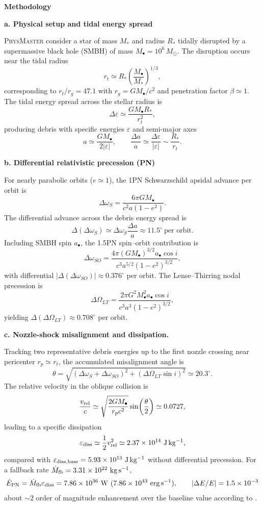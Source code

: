 \documentclass[11pt, a4paper, logo, copyright, nonumbering]{SAI}
\newcommand{\agent}{\textsc{PhysMaster}\xspace}
\begin{document}
\noindent \textbf{Methodology}

\noindent \textbf{a. Physical setup and tidal energy spread} 

\agent consider a star of mass $M_*$ and radius $R_*$ tidally disrupted by a supermassive black hole (SMBH) of mass 
$M_\bullet = 10^6\,M_\odot$. The disruption occurs near the tidal radius
\[
r_t \simeq R_* \left(\frac{M_\bullet}{M_*}\right)^{1/3},
\]
corresponding to $r_t/r_g = 47.1$ with $r_g = GM_\bullet/c^2$ and penetration factor $\beta \simeq 1$. 
The tidal energy spread across the stellar radius is
\[
\Delta\varepsilon \simeq \frac{GM_\bullet R_*}{r_t^2},
\]
producing debris with specific energies $\varepsilon$ and semi-major axes
\[
a \simeq \frac{GM_\bullet}{2|\varepsilon|}, 
\qquad 
\frac{\Delta a}{a} \simeq \frac{\Delta\varepsilon}{|\varepsilon|} \sim \frac{R_*}{r_t}.
\]

\noindent \textbf{b. Differential relativistic precession (PN)}

For nearly parabolic orbits ($e\simeq1$), the 1PN Schwarzschild apsidal advance per orbit is
\[
\Delta\omega_S = \frac{6\pi GM_\bullet}{c^2 a(1-e^2)}.
\]
The differential advance across the debris energy spread is
\[
\Delta(\Delta\omega_S) \simeq \Delta\omega_S \frac{\Delta a}{a} \approx 11.5^\circ \ \text{per orbit}.
\]
Including SMBH spin $a_\bullet$, the 1.5PN spin--orbit contribution is
\[
\Delta\omega_{SO} = 
\frac{4\pi (GM_\bullet)^{3/2} a_\bullet \cos i}
     {c^3 a^{5/2}(1-e^2)^{3/2}},
\]
with differential $|\Delta(\Delta\omega_{SO})| \approx 0.376^\circ$ per orbit. 
The Lense--Thirring nodal precession is
\[
\Delta\Omega_{LT} =
\frac{2\pi G^2 M_\bullet^2 a_\bullet \cos i}
     {c^3 a^3 (1-e^2)^{3/2}},
\]
yielding $\Delta(\Delta\Omega_{LT}) \approx 0.708^\circ$ per orbit.

\noindent \textbf{c. Nozzle-shock misalignment and dissipation.}

Tracking two representative debris energies up to the first nozzle crossing near pericenter 
$r_p\simeq r_t$, the accumulated misalignment angle is
\[
\theta = 
\sqrt{(\Delta\omega_S+\Delta\omega_{SO})^2
      +(\Delta\Omega_{LT}\sin i)^2}
\simeq 20.3^\circ .
\]
The relative velocity in the oblique collision is
\[
\frac{v_{\rm rel}}{c}
\simeq 
\sqrt{\frac{2GM_\bullet}{r_p c^2}}
\sin\!\left(\frac{\theta}{2}\right)
\simeq 0.0727,
\]
leading to a specific dissipation
\[
\varepsilon_{\rm diss}
\simeq \frac{1}{2}v_{\rm rel}^2
\simeq 2.37\times10^{14}\ \mathrm{J\,kg^{-1}},
\]
compared with $\varepsilon_{\rm diss,base}=5.93\times10^{13}\ \mathrm{J\,kg^{-1}}$ without differential precession.
For a fallback rate $\dot M_{\rm fb}=3.31\times10^{22}\ \mathrm{kg\,s^{-1}}$,
\[
\dot E_{\rm PN}=\dot M_{\rm fb}\varepsilon_{\rm diss}
=7.86\times10^{36}\ \mathrm{W}
\ (7.86\times10^{43}\ \mathrm{erg\,s^{-1}}),
\qquad |\Delta E/E|=1.5\times10^{-3}
\]
about $\sim2$ order of magnitude enhancement over the baseline value according to \cite{hu2025convergedsimulationsnozzleshock}.
\end{document}

